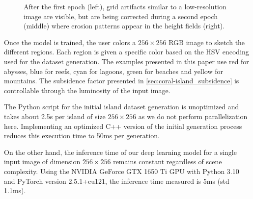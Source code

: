 \begin{figure}[t]
    \caption{After the first epoch (left), grid artifacts similar to a low-resolution image are visible, but are being corrected during a second epoch (middle) where erosion patterns appear in the height fields (right).}
    \label{fig:coral-island_first-epoch}
\end{figure}

Once the model is trained, the user colors a $256\times256$ RGB image to sketch the different regions. Each region is given a specific color based on the HSV encoding used for the dataset generation. The examples presented in this paper use red for abysses, blue for reefs, cyan for lagoons, green for beaches and yellow for mountains. The subsidence factor presented in \cref{sec:coral-island_subsidence} is controllable through the luminosity of the input image. 


The Python script for the initial island dataset generation is unoptimized and takes about 2.5s per island of size $256 \times 256$ as we do not perform parallelization here. Implementing an optimized C++ version of the initial generation process reduces this execution time to 50ms per generation.

On the other hand, the inference time of our deep learning model for a single input image of dimension $256 \times 256$ remains constant regardless of scene complexity. Using the NVIDIA GeForce GTX 1650 Ti GPU with Python 3.10 and PyTorch version 2.5.1+cu121, the inference time measured is 5ms (std 1.1ms). 

